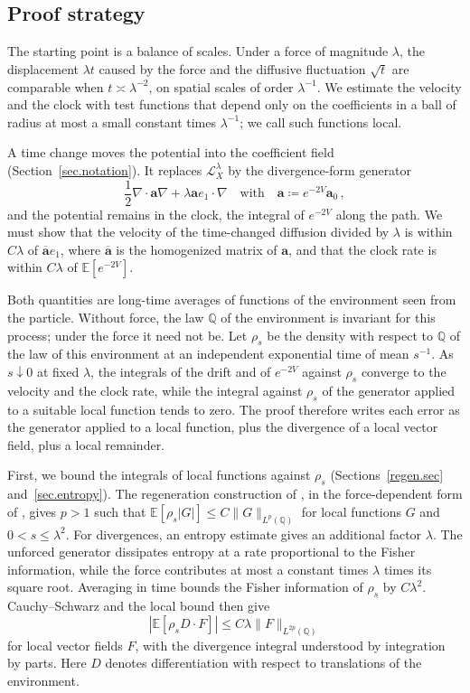 \documentclass[11pt]{amsart}
\theoremstyle{definition}
\theoremstyle{remark}
\numberwithin{equation}{section}
\newcommand{\E}{\mathbb E}
\newcommand{\Q}{\mathbb Q}
\renewcommand{\a}{\mathbf a}
\newcommand{\ahom}{\overline{\mathbf a}}
\begin{document}
\subsection{Proof strategy}\label{ss.strategy}

The starting point is a balance of scales. Under a force of magnitude $\lambda$, the displacement $\lambda t$ caused by the force and the diffusive fluctuation $\sqrt t$ are comparable when $t\asymp\lambda^{-2}$, on spatial scales of order $\lambda^{-1}$. We estimate the velocity and the clock with test functions that depend only on the coefficients in a ball of radius at most a small constant times $\lambda^{-1}$; we call such functions local.

A time change moves the potential into the coefficient field (Section~\ref{sec.notation}). It replaces $\mathcal L_X^\lambda$ by the divergence-form generator
\begin{equation*}
 \frac12\nabla\cdot\a\nabla+\lambda\a e_1\cdot\nabla
 \quad\text{with}\quad \a\coloneqq e^{-2V}\a_0\, ,
\end{equation*}
and the potential remains in the clock, the integral of $e^{-2V}$ along the path. We must show that the velocity of the time-changed diffusion divided by $\lambda$ is within $C\lambda$ of $\ahom e_1$, where $\ahom$ is the homogenized matrix of $\a$, and that the clock rate is within $C\lambda$ of $\E[e^{-2V}]$.

Both quantities are long-time averages of functions of the environment seen from the particle. Without force, the law $\Q$ of the environment is invariant for this process; under the force it need not be. Let $\rho_s$ be the density with respect to $\Q$ of the law of this environment at an independent exponential time of mean $s^{-1}$. As $s\downarrow0$ at fixed $\lambda$, the integrals of the drift and of $e^{-2V}$ against $\rho_s$ converge to the velocity and the clock rate, while the integral against $\rho_s$ of the generator applied to a suitable local function tends to zero. The proof therefore writes each error as the generator applied to a local function, plus the divergence of a local vector field, plus a local remainder.

First, we bound the integrals of local functions against $\rho_s$ (Sections~\ref{regen.sec} and~\ref{sec.entropy}). The regeneration construction of \citet*{ballistic2003shen}, in the force-dependent form of \citet[Section~5]{Einstein2012gantert}, gives $p>1$ such that $\E[\rho_s|G|]\leq C\|G\|_{L^p(\Q)}$ for local functions $G$ and $0<s\leq\lambda^2$. For divergences, an entropy estimate gives an additional factor $\lambda$. The unforced generator dissipates entropy at a rate proportional to the Fisher information, while the force contributes at most a constant times $\lambda$ times its square root. Averaging in time bounds the Fisher information of $\rho_s$ by $C\lambda^2$. Cauchy--Schwarz and the local bound then give
\begin{equation*}
 \left|\E[\rho_s D\cdot F]\right|
 \leq C\lambda\|F\|_{L^{2p}(\Q)}
\end{equation*}
for local vector fields $F$, with the divergence integral understood by integration by parts. Here $D$ denotes differentiation with respect to translations of the environment.
\end{document}
